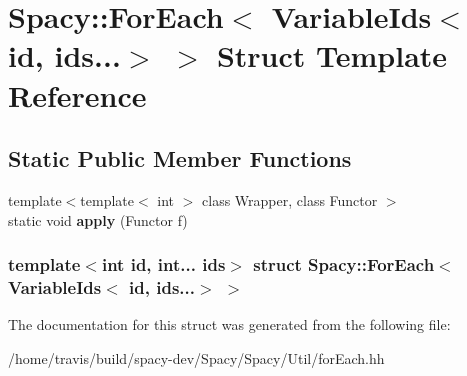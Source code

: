 \hypertarget{structSpacy_1_1ForEach_3_01VariableIds_3_01id_00_01ids_8_8_8_4_01_4}{\section{\-Spacy\-:\-:\-For\-Each$<$ \-Variable\-Ids$<$ id, ids...$>$ $>$ \-Struct \-Template \-Reference}
\label{structSpacy_1_1ForEach_3_01VariableIds_3_01id_00_01ids_8_8_8_4_01_4}
}
\subsection*{\-Static \-Public \-Member \-Functions}
\begin{DoxyCompactItemize}
\item 
\hypertarget{structSpacy_1_1ForEach_3_01VariableIds_3_01id_00_01ids_8_8_8_4_01_4_a7030374bdacbad991364cdf2a41dec0f}{{\footnotesize template$<$template$<$ int $>$ class \-Wrapper, class Functor $>$ }\\static void {\bfseries apply} (\-Functor f)}\label{structSpacy_1_1ForEach_3_01VariableIds_3_01id_00_01ids_8_8_8_4_01_4_a7030374bdacbad991364cdf2a41dec0f}

\end{DoxyCompactItemize}
\subsubsection*{template$<$int id, int... ids$>$ struct Spacy\-::\-For\-Each$<$ Variable\-Ids$<$ id, ids...$>$ $>$}



\-The documentation for this struct was generated from the following file\-:\begin{DoxyCompactItemize}
\item 
/home/travis/build/spacy-\/dev/\-Spacy/\-Spacy/\-Util/for\-Each.\-hh\end{DoxyCompactItemize}
